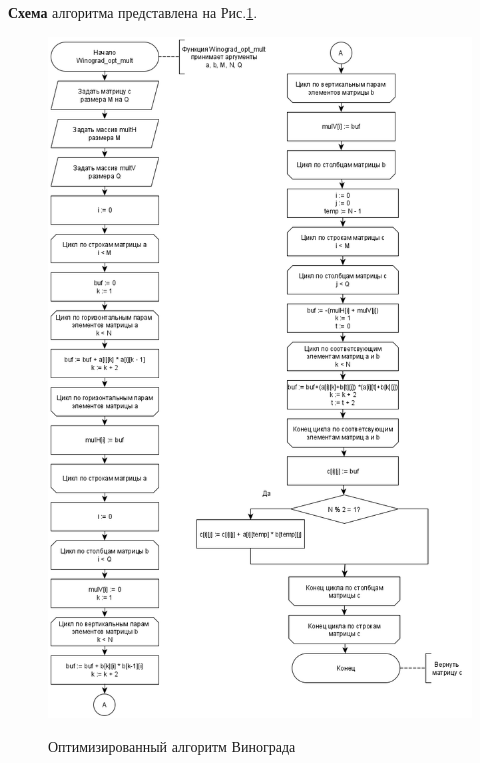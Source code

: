\textbf{Схема} алгоритма представлена на Рис.\ref{fig3:image}.
\begin{figure}[h]
	\begin{center}
		{\includegraphics[scale = 0.5]{schemes/opt_winograd}}
		\caption{Оптимизированный алгоритм Винограда}
		\label{fig3:image}
	\end{center}
\end{figure}

